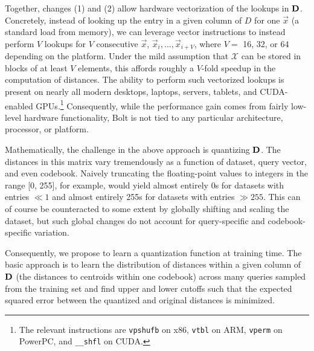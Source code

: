 Together, changes (1) and (2) allow hardware vectorization of the lookups in $\mathbf{D}$. Concretely, instead of looking up the entry in a given column of $D$ for one $\vec{x}$ (a standard load from memory), we can leverage vector instructions to instead perform $V$ lookups for $V$ consecutive $\vec{x}$, $\vec{x}_i,\ldots,\vec{x}_{i+V}$, where $V = $ 16, 32, or 64 depending on the platform. Under the mild assumption that $\mathcal{X}$ can be stored in blocks of at least $V$ elements, this affords roughly a $V$-fold speedup in the computation of distances. The ability to perform such vectorized lookups is present on nearly all modern desktops, laptops, servers, tablets, and CUDA-enabled GPUs.\footnote{The relevant instructions are \texttt{vpshufb} on x86, \texttt{vtbl} on ARM, \texttt{vperm} on PowerPC, and \texttt{\_\_shfl} on CUDA.} Consequently, while the performance gain comes from fairly low-level hardware functionality, Bolt is not tied to any particular architecture, processor, or platform.

Mathematically, the challenge in the above approach is quantizing $\mathbf{D}$. The distances in this matrix vary tremendously as a function of dataset, query vector, and even codebook. Naively truncating the floating-point values to integers in the range [0, 255], for example, would yield almost entirely 0s for datasets with entries $ \ll 1$ and almost entirely 255s for datasets with entries $ \gg 255$. This can of course be counteracted to some extent by globally shifting and scaling the dataset, but such global changes do not account for query-specific and codebook-specific variation.

Consequently, we propose to learn a quantization function at training time. The basic approach is to learn the distribution of distances within a given column of $\mathbf{D}$ (the distances to centroids within one codebook) across many queries sampled from the training set and find upper and lower cutoffs such that the expected squared error between the quantized and original distances is minimized.

